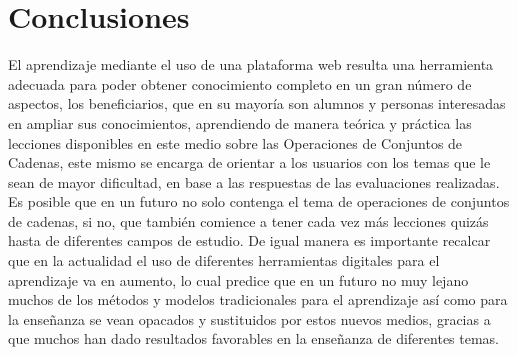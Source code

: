 \documentclass{llncs}
\begin{document}
\section{Conclusiones}
El aprendizaje mediante el uso de una plataforma web resulta una herramienta adecuada para poder obtener conocimiento completo en un gran número de aspectos, los beneficiarios, que en su mayoría son alumnos y personas interesadas en ampliar sus conocimientos, aprendiendo de manera teórica y práctica las lecciones disponibles en este medio sobre las Operaciones de Conjuntos de Cadenas, este mismo se encarga de orientar a los usuarios con los temas que le sean de mayor dificultad, en base a las respuestas de las evaluaciones realizadas. Es posible que en un futuro no solo contenga el tema de operaciones de conjuntos de cadenas, si no, que también comience a tener cada vez más lecciones quizás hasta de diferentes campos de estudio. De igual manera es importante recalcar que en la actualidad el uso de diferentes herramientas digitales para el aprendizaje va en aumento, lo cual predice que en un futuro no muy lejano muchos de los métodos y modelos tradicionales para el aprendizaje así como para la enseñanza se vean opacados y sustituidos por estos nuevos medios, gracias a que muchos han dado resultados favorables en la enseñanza de diferentes temas.

%
\end{document}
